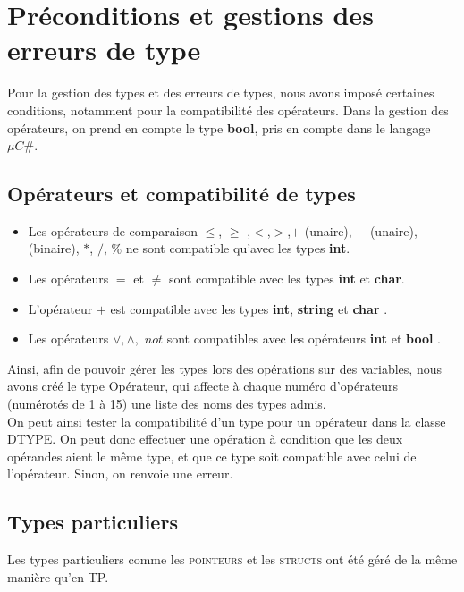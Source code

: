 \documentclass[11pt,a4paper]{report}
\begin{document}



\section{Préconditions et gestions des erreurs de type}

Pour la gestion des types et des erreurs de types, nous avons imposé certaines conditions, notamment pour la compatibilité des opérateurs. Dans la gestion des opérateurs, on prend en compte le type {\bf bool}, pris en compte dans le langage $\mu C \#$.


\subsection{Opérateurs et compatibilité de types}

\begin{itemize}
\item Les opérateurs de comparaison $\leq$, $\geq$ ,$<$,$>$,$+$ (unaire), $-$ (unaire), $-$ (binaire), $*$, $/$, $\%$ ne sont compatible qu'avec les types \textbf{ int}.
\item Les opérateurs $=$ et $\neq$  sont compatible avec les types {\bf int} et {\bf char}.
\item L'opérateur $+$ est compatible avec les types {\bf int}, {\bf string } et {\bf char }.
\item Les opérateurs $\vee,\wedge,$ $not$ sont compatibles avec les opérateurs {\bf int } et {\bf bool }.
\end{itemize}

Ainsi, afin de pouvoir gérer les types lors des opérations sur des variables, nous avons créé le type Opérateur, qui affecte à chaque numéro d'opérateurs (numérotés de 1 à 15) une liste des noms des types admis.\\
 On peut ainsi tester la compatibilité d'un type pour un opérateur dans la classe DTYPE. On peut donc effectuer une opération à condition que les deux opérandes aient le même type, et que ce type soit compatible avec celui de l'opérateur. Sinon, on renvoie une erreur.



\subsection{Types particuliers}

 Les types particuliers comme les \textsc{pointeurs} et les \textsc{structs} ont été géré de la même manière qu'en TP.
\end{document}
